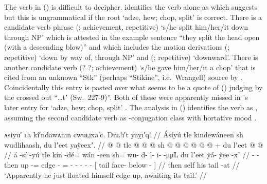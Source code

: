 The verb in (\lastx) is difficult to decipher.
\citeauthor{swanton:1909} identifies the verb alone as  which suggests  but this is ungrammatical if the root  ‘adze, hew; chop, split’ is correct.
There is a candidate verb phrase  (; achievement,  repetitive) ‘s/he split him/her/it down through NP’ which is attested in the example sentence  “they split the head open (with a descending blow)” \parencite[205.2864]{story-naish:1973} and which includes the motion derivations  (;  repetitive) ‘down by way of, through NP’ and  (;  repetitive) ‘downward’.
There is another candidate verb  (? ?; achievement) ‘s/he gave him/her/it a chop’ that is cited from an unknown “Stk” (perhaps “Stikine”, i.e.\ Wrangell) source by \textcite[f02/785]{leer:1973}.
Coincidentally this entry is pasted over what seems to be a quote of (\lastx) judging by the crossed out “…tʼ (Sw.\ 227-9)”.
Both of these were apparently missed in \citeauthor{leer:1976}’s later entry for  ‘adze, hew; chop, split’ \parencite[818]{leer:1976}.
The analysis in (\lastx) identifies the verb as , assuming the second candidate verb as -conjugation class with hortative mood .


\ex\label{ex:91-238-float-edge-up}%
%
\begingl
	\glpreamble	ᴀsiyu′ ʟa kî′ndawᴀnīn cwuʟ̣ixā′c. Duʟ!ī′t yaỵī′q! //
	\glpreamble	Ásíyú tle kindewáneen sh wudlihaash, du lʼeet yaÿeexʼ. //
	\gla	{} @ {} @ {} tle
		 @ {} @ {} @ {} 
		sh @  @ {} @ {} @ {} @ {} @ {} +
		{} du lʼeet  @ {} @ {} {} //
	\glb	á -sí -yú tle
		kín -dé= wán -een
		sh= wu- d- l- i-  -μμL
		{} du lʼeet ÿá- ÿee -xʼ {} //
	\glc	{} - - then
		up -= edge -
		= - - - -  -
		{}[  tail face- below - {}] //
	\gld	{} {} {} then
		 {} {} {}
		self  {} {} {} {} {}
		{} his tail  {} -at {} //
	\glft	‘Apparently he just floated himself edge up, awaiting its tail.’
		//
\endgl
\xe

